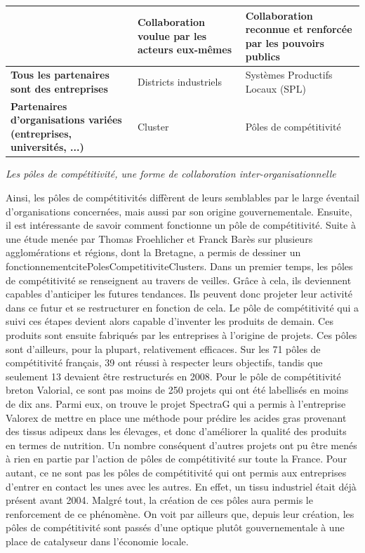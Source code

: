 \documentclass[a4paper,10pt]{report}
\begin{document}
		\noindent
		\begin{tabular}{|M{110pt}|M{100pt}|M{100pt}|}
			\hline
			& \textbf{Collaboration voulue par les acteurs eux-mêmes} & \textbf{Collaboration reconnue et renforcée par les pouvoirs publics}\\
			\hline
			\textbf{Tous les partenaires sont des entreprises} & Districts industriels & Systèmes Productifs Locaux (SPL)\\
			\hline
			\textbf{Partenaires d'organisations variées (entreprises, universités, ...)} & Cluster & Pôles de compétitivité\\
			\hline
		\end{tabular}
		\emph{Les pôles de compétitivité, une forme de collaboration inter-organisationnelle\\}

		Ainsi, les pôles de compétitivités diffèrent de leurs semblables par le large éventail d’organisations concernées, mais aussi par son origine gouvernementale.
		Ensuite, il est intéressante de savoir comment fonctionne un pôle de compétitivité. Suite à une étude menée par Thomas Froehlicher et Franck Barès sur plusieurs agglomérations et régions, dont la Bretagne, a permis de dessiner un fonctionnementcite{PolesCompetitiviteClusters}. Dans un premier temps, les pôles de compétitivité se renseignent au travers de veilles. Grâce à cela, ils deviennent capables d’anticiper les futures tendances. Ils peuvent donc projeter leur activité dans ce futur et se restructurer en fonction de cela. Le pôle de compétitivité qui a suivi ces étapes devient alors capable d’inventer les produits de demain. Ces produits sont ensuite fabriqués par les entreprises à l’origine de projets.
		Ces pôles sont d’ailleurs, pour la plupart, relativement efficaces. Sur les 71 pôles de compétitivité français, 39 ont réussi à respecter leurs objectifs, tandis que seulement 13 devaient être restructurés en 2008\cite{PolesCompetitiviteClusters}. Pour le pôle de compétitivité breton Valorial, ce sont pas moins de 250 projets qui ont été labellisés en moins de dix ans\cite{ProjetsValorial}. Parmi eux, on trouve le projet SpectraG qui a permis à l’entreprise Valorex de mettre en place une méthode pour prédire les acides gras provenant des tissus adipeux dans les élevages, et donc d’améliorer la qualité des produits en termes de nutrition\cite{ProjetsAboutis}. Un nombre conséquent d’autres projets ont pu être menés à rien en partie par l’action de pôles de compétitivité sur toute la France.
		Pour autant, ce ne sont pas les pôles de compétitivité qui ont permis aux entreprises d’entrer en contact les unes avec les autres. En effet, un tissu industriel était déjà présent avant 2004. Malgré tout, la création de ces pôles aura permis le renforcement de ce phénomène. On voit par ailleurs que, depuis leur création, les pôles de compétitivité sont passés d’une optique plutôt gouvernementale à une place de catalyseur dans l’économie locale.
\end{document}
